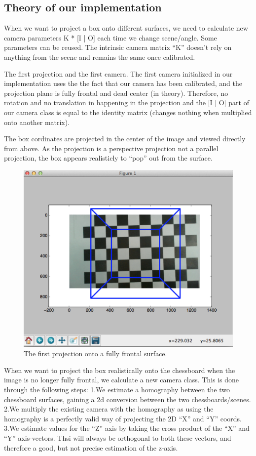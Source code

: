 \subsection{Theory of our implementation}

When we want to project a box onto different surfaces, we need to
calculate new camera parameters K * [I | O] each time we change
scene/angle. Some parameters can be reused. The intrinsic camera matrix “K”
doesn’t rely on anything from the scene and remains the same once calibrated. 

The first projection and the first camera.
The first camera initialized in our implementation uses the the fact that our
camera has been calibrated, and the projection plane is fully frontal and dead
center (in theory).
Therefore, no rotation and no translation in happening in the projection and
the [I | O] part of our camera class is equal to the identity matrix
(changes nothing when multiplied onto another matrix). 

The box cordinates are projected in the center of the image and viewed
directly from above.
As the projection is a perspective projection not a parallel projection, the
box appears realisticly to “pop” out from the surface. 

\begin{figure}[H]
\center
\includegraphics{pics/aug1}
\caption{The first projection onto a fully frontal surface.}
\label{aug1}
\end{figure}

When we want to project the box realistically onto the chessboard when the image
is no longer fully frontal, we calculate a new camera class.
This is done through the following steps:
1.We estimate a homography between the two chessboard surfaces, gaining a 2d
conversion between the two chessboards/scenes.
2.We multiply the existing camera with the homography as using the
homography is a perfectly valid way of projecting the 2D “X” and “Y” coords.
3.We estimate values for the “Z” axis by taking the cross product of the “X”
and “Y” axis-vectors. Thsi will always be orthogonal to both these
vectors, and therefore a good, but not precise estimation of the z-axis.


